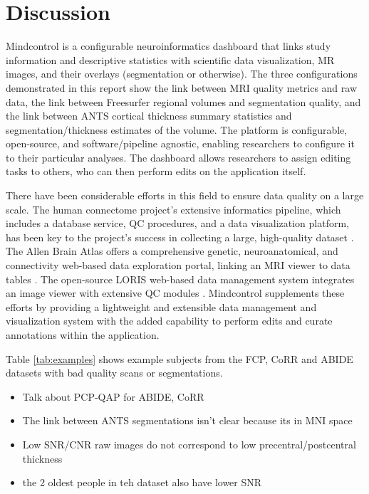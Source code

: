 \section{Discussion}

Mindcontrol is a configurable neuroinformatics dashboard that links study information and descriptive statistics with scientific data visualization, MR images, and their overlays (segmentation or otherwise). The three configurations demonstrated in this report show the link between MRI quality metrics and raw data, the link between Freesurfer regional volumes and segmentation quality, and the link between ANTS cortical thickness summary statistics and segmentation/thickness estimates of the volume. The platform is configurable, open-source, and software/pipeline agnostic, enabling researchers to configure it to their particular analyses. The dashboard allows researchers to assign editing tasks to others, who can then perform edits on the application itself. 

There have been considerable efforts in this field to ensure data quality on a large scale. The human connectome project's extensive informatics pipeline, which includes a database service, QC procedures, and a data visualization platform, has been key to the project's success in collecting a large, high-quality dataset \cite{Marcus_2013}. The Allen Brain Atlas offers a comprehensive genetic, neuroanatomical, and connectivity web-based data exploration portal, linking an MRI viewer to data tables \cite{Sunkin_2012}. The open-source LORIS web-based data management system integrates an image viewer with extensive QC modules \cite{Das_2012}. Mindcontrol supplements these efforts by providing a lightweight and extensible data management and visualization system with the added capability to perform edits and curate annotations within the application. 

Table \ref{tab:examples} shows example subjects from the FCP, CoRR and ABIDE datasets with bad quality scans or segmentations. 
\begin{itemize}
\item Talk about PCP-QAP for ABIDE, CoRR
\item The link between ANTS segmentations isn't clear because its in MNI space
\item Low SNR/CNR raw images do not correspond to low precentral/postcentral thickness
\item the 2 oldest people in teh dataset also have lower SNR
\end{itemize}


